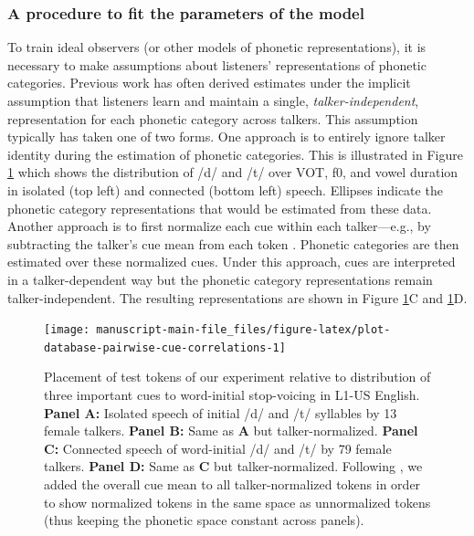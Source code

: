 \documentclass[
  11pt,
  man,mask,floatsintext]{apa6}
\begin{document}
\subsubsection{A procedure to fit the parameters of the model}\label{sec:io-fitting}

To train ideal observers (or other models of phonetic representations), it is necessary to make assumptions about listeners' representations of phonetic categories. Previous work has often derived estimates under the implicit assumption that listeners learn and maintain a single, \emph{talker-independent}, representation for each phonetic category across talkers. This assumption typically has taken one of two forms. One approach is to entirely ignore talker identity during the estimation of phonetic categories. This is illustrated in Figure \ref{fig:plot-database-pairwise-cue-correlations} which shows the distribution of /d/ and /t/ over VOT, f0, and vowel duration in isolated (top left) and connected (bottom left) speech. Ellipses indicate the phonetic category representations that would be estimated from these data. Another approach is to first normalize each cue within each talker---e.g., by subtracting the talker's cue mean from each token \autocites[e.g.,][]{mcmurray2011,mcmurray-jongman2011}[for review, see][]{apfelbaum-mcmurray2015,weatherholtz-jaeger2016}. Phonetic categories are then estimated over these normalized cues. Under this approach, cues are interpreted in a talker-dependent way but the phonetic category representations remain talker-independent. The resulting representations are shown in Figure \ref{fig:plot-database-pairwise-cue-correlations}C and \ref{fig:plot-database-pairwise-cue-correlations}D.



\begin{figure}

{\centering \texttt{[image: manuscript-main-file\_files/figure-latex/plot-database-pairwise-cue-correlations-1]} 

}

\caption{Placement of test tokens of our experiment relative to distribution of three important cues to word-initial stop-voicing in L1-US English. \textbf{Panel A:} Isolated speech of initial /d/ and /t/ syllables by 13 female talkers. \textbf{Panel B:} Same as \textbf{A} but talker-normalized. \textbf{Panel C:} Connected speech of word-initial /d/ and /t/ by 79 female talkers. \textbf{Panel D:} Same as \textbf{C} but talker-normalized. Following \textcite{xie2023}, we added the overall cue mean to all talker-normalized tokens in order to show normalized tokens in the same space as unnormalized tokens (thus keeping the phonetic space constant across panels).}\label{fig:plot-database-pairwise-cue-correlations}
\end{figure}
\end{document}
